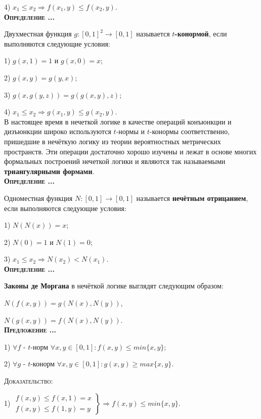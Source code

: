 \documentclass[18pt, a4paper]{extarticle}
\newcounter{par}
\newcounter{spar}
\newcounter{zap}
\newcommand{\opr}{\textbf{\textsc{Определение \thepar.\if\thespar1\thespar.\fi\thezap.\;}}\stepcounter{zap}}
\newcommand{\predl}{\textbf{\textsc{Предложение \thepar.\if\thespar1\thespar.\fi\thezap.\;}}\stepcounter{zap}}
\newcommand{\dok}{\textsc{Доказательство:}}
\begin{document}
4) $x_1\leqslant x_2\Rightarrow f(x_1,y)\leqslant f(x_2,y)$.\\

\opr

Двухместная функция $g\!\!:\![0,1]^2\to[0,1]$ называется $t$\textbf{-конормой}, если выполняются следующие условия:

1) $g(x,1)=1$ и $g(x,0)=x$;

2) $g(x,y)=g(y,x)$;

3) $g(x,g(y,z))=g(g(x,y),z)$;

4) $x_1\leqslant x_2\Rightarrow g(x_1,y)\leqslant g(x_2,y)$.\\

В настоящее время в нечеткой логике в качестве операций конъюнкции и дизъюнкции широко используются $t$-нормы и $t$-конормы соответственно, пришедшие в нечёткую логику из теории вероятностных метрических пространств. Эти операции достаточно хорошо изучены и лежат в основе многих формальных построений нечеткой логики и являются так называемыми \textbf{триангулярными формами}.\\

\opr 

Одноместная функция $N\!\!:\![0,1]\to[0,1]$ называется \textbf{нечётным отрицанием}, если выполняются следующие условия:

1) $N(N(x))=x$;

2) $N(0)=1$ и $N(1)=0$;

3) $x_1\leqslant x_2\Rightarrow N(x_2)<N(x_1)$.\\

\opr

\textbf{Законы де Моргана} в нечёткой логике выглядят следующим образом:

$N(f(x,y))=g(N(x),N(y))$,

$N(g(x,y))=f(N(x),N(y))$.\\

\predl

1) $\forall f$ - $t$-норм $\forall x,y\in[0,1]\!: f(x,y)\leqslant min\{x,y\}$;

2) $\forall g$ - $t$-конорм $\forall x,y\in[0,1]\!: g(x,y)\geqslant max\{x,y\}$.

\dok 

1) $\left.
  \begin{array}{c}
    f(x,y)\leqslant f(x,1)=x \\
    f(x,y)\leqslant f(1,y)=y
  \end{array}
  \right\}\Rightarrow f(x,y)\leqslant min\{x,y\}.$\\
  
\end{document}
